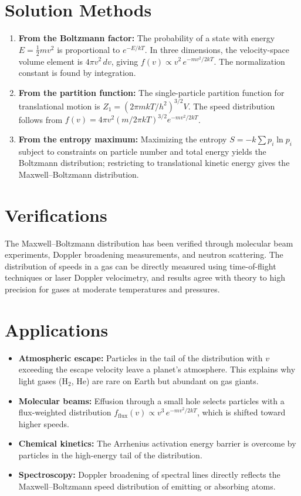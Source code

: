 \section*{Solution Methods}

\begin{enumerate}
  \item \textbf{From the Boltzmann factor:} The probability of a state with energy $E = \frac{1}{2}mv^{2}$ is proportional to $e^{-E/kT}$. In three dimensions, the velocity-space volume element is $4\pi v^{2}\,dv$, giving $f(v) \propto v^{2}\,e^{-mv^{2}/2kT}$. The normalization constant is found by integration.
  \item \textbf{From the partition function:} The single-particle partition function for translational motion is $Z_{1} = (2\pi mkT/h^{2})^{3/2}V$. The speed distribution follows from $f(v) = 4\pi v^{2}(m/2\pi kT)^{3/2}e^{-mv^{2}/2kT}$.
  \item \textbf{From the entropy maximum:} Maximizing the entropy $S = -k\sum p_{i}\ln p_{i}$ subject to constraints on particle number and total energy yields the Boltzmann distribution; restricting to translational kinetic energy gives the Maxwell--Boltzmann distribution.
\end{enumerate}
\section*{Verifications}

The Maxwell--Boltzmann distribution has been verified through molecular beam experiments, Doppler broadening measurements, and neutron scattering. The distribution of speeds in a gas can be directly measured using time-of-flight techniques or laser Doppler velocimetry, and results agree with theory to high precision for gases at moderate temperatures and pressures.
\section*{Applications}

\begin{itemize}
  \item \textbf{Atmospheric escape:} Particles in the tail of the distribution with $v$ exceeding the escape velocity leave a planet's atmosphere. This explains why light gases (H$_{2}$, He) are rare on Earth but abundant on gas giants.
  \item \textbf{Molecular beams:} Effusion through a small hole selects particles with a flux-weighted distribution $f_{\text{flux}}(v) \propto v^{3}\,e^{-mv^{2}/2kT}$, which is shifted toward higher speeds.
  \item \textbf{Chemical kinetics:} The Arrhenius activation energy barrier is overcome by particles in the high-energy tail of the distribution.
  \item \textbf{Spectroscopy:} Doppler broadening of spectral lines directly reflects the Maxwell--Boltzmann speed distribution of emitting or absorbing atoms.
\end{itemize}
